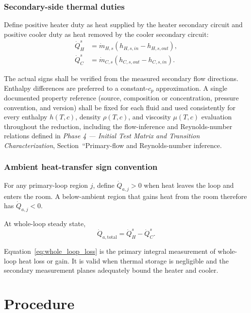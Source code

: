 \documentclass[11pt]{article}
\newcommand{\QHs}{\dot Q_{H}^{s}}
\newcommand{\QCs}{\dot Q_{C}^{s}}
\newcommand{\PhaseFourDoc}{\textit{Phase 4 --- Initial Test Matrix and Transition Characterization}}
\begin{document}
\subsubsection{Secondary-side thermal duties}
\label{sec:secondary_duty}

Define positive heater duty as heat supplied by the heater secondary circuit and positive cooler duty as heat removed by the cooler secondary circuit:
\begin{align}
\QHs &= \dot m_{H,s}\left(h_{H,s,in}-h_{H,s,out}\right), \\
\QCs &= \dot m_{C,s}\left(h_{C,s,out}-h_{C,s,in}\right).
\end{align}

The actual signs shall be verified from the measured secondary flow directions. Enthalpy differences are preferred to a constant-$c_p$ approximation. A single documented property reference (source, composition or concentration, pressure convention, and version) shall be fixed for each fluid and used consistently for every enthalpy $h(T,c)$, density $\rho(T,c)$, and viscosity $\mu(T,c)$ evaluation throughout the reduction, including the flow-inference and Reynolds-number relations defined in \PhaseFourDoc, Section~``Primary-flow and Reynolds-number inference. 

\subsubsection{Ambient heat-transfer sign convention}

For any primary-loop region $j$, define $\dot Q_{a,j}>0$ when heat leaves the loop and enters the room. A below-ambient region that gains heat from the room therefore has $\dot Q_{a,j}<0$.

At whole-loop steady state,
\begin{equation}
\dot Q_{a,\mathrm{total}}=\QHs-\QCs.
\label{eq:whole_loop_loss}
\end{equation}

Equation~\eqref{eq:whole_loop_loss} is the primary integral measurement of whole-loop heat loss or gain. It is valid when thermal storage is negligible and the secondary measurement planes adequately bound the heater and cooler.




\clearpage
\section{Procedure}
\label{sec:procedure}
\label{sec:test_procedure}
\label{sec:phase0}
\end{document}
